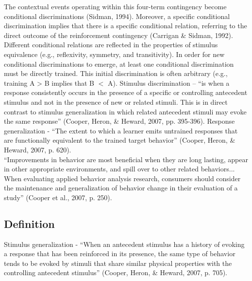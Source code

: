 The contextual events operating within this four-term contingency become conditional discriminations (Sidman, 1994).   Moreover, a specific conditional discrimination implies that there is a specific conditional relation, referring to the direct outcome of the reinforcement contingency (Carrigan \& Sidman, 1992).  Different conditional relations are reflected in the properties of stimulus equivalence (e.g., reflexivity, symmetry, and transitivity).  In order for new conditional discriminations to emerge, at least one conditional discrimination must be directly trained.  This initial discrimination is often arbitrary (e.g., training A > B implies that B $<$ A). 
%
Stimulus discrimination – ``is when a response consistently occurs in the presence of a specific or controlling antecedent stimulus and not in the presence of new or related stimuli.  This is in direct contrast to stimulus generalization in which related antecedent stimuli may evoke the same response'' (Cooper, Heron, \& Heward, 2007, pp. 395-396).    
%
Response generalization - ``The extent to which a learner emits untrained responses that are functionally equivalent to the trained target behavior'' (Cooper, Heron, \& Heward, 2007, p. 620).\\
%
``Improvements in behavior are most beneficial when they are long lasting, appear in other appropriate environments, and spill over to other related behaviors... When evaluating applied behavior analysis research, consumers should consider the maintenance and generalization of behavior change in their evaluation of a study'' (Cooper et al., 2007, p. 250).\\
%
\subsection{Definition} 
Stimulus generalization - ``When an antecedent stimulus has a history of evoking a response that has been reinforced in its presence, the same type of behavior tends to be evoked by stimuli that share similar physical properties with the controlling antecedent stimulus'' (Cooper, Heron, \& Heward, 2007, p. 705).
%
